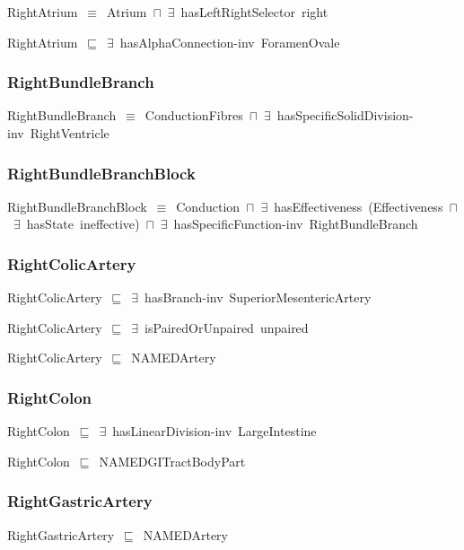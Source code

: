 \documentclass{article}
\begin{document}
RightAtrium~\ensuremath{\equiv}~Atrium~\ensuremath{\sqcap}~\ensuremath{\exists}~hasLeftRightSelector~right

RightAtrium~\ensuremath{\sqsubseteq}~\ensuremath{\exists}~hasAlphaConnection-inv~ForamenOvale~

\subsubsection*{RightBundleBranch}

RightBundleBranch~\ensuremath{\equiv}~ConductionFibres~\ensuremath{\sqcap}~\ensuremath{\exists}~hasSpecificSolidDivision-inv~RightVentricle

\subsubsection*{RightBundleBranchBlock}

RightBundleBranchBlock~\ensuremath{\equiv}~Conduction~\ensuremath{\sqcap}~\ensuremath{\exists}~hasEffectiveness~(Effectiveness~\ensuremath{\sqcap}~\ensuremath{\exists}~hasState~ineffective)~\ensuremath{\sqcap}~\ensuremath{\exists}~hasSpecificFunction-inv~RightBundleBranch

\subsubsection*{RightColicArtery}

RightColicArtery~\ensuremath{\sqsubseteq}~\ensuremath{\exists}~hasBranch-inv~SuperiorMesentericArtery~

RightColicArtery~\ensuremath{\sqsubseteq}~\ensuremath{\exists}~isPairedOrUnpaired~unpaired~

RightColicArtery~\ensuremath{\sqsubseteq}~NAMEDArtery~

\subsubsection*{RightColon}

RightColon~\ensuremath{\sqsubseteq}~\ensuremath{\exists}~hasLinearDivision-inv~LargeIntestine~

RightColon~\ensuremath{\sqsubseteq}~NAMEDGITractBodyPart~

\subsubsection*{RightGastricArtery}

RightGastricArtery~\ensuremath{\sqsubseteq}~NAMEDArtery~
\end{document}
